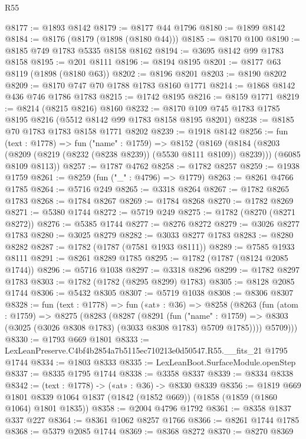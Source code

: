 \begin{lexlean}{R55}
\begin{coremodule}
@8177 := @1893 @8142
@8179 := @8177 @44 @1796
@8180 := @1899 @8142
@8184 := @8176 (@8179 (@1898 (@8180 @44)))
@8185 := @8170 @100
@8190 := @8185 @749 @1783 @5335 @8158 @8162
@8194 := @3695 @8142 @99 @1783 @8158
@8195 := @201 @8111
@8196 := @8194 @8195
@8201 := @8177 @63 @8119 (@1898 (@8180 @63))
@8202 := @8196 @8201
@8203 := @8190 @8202
@8209 := @8170 @747 @70 @1788 @1783 @8160 @1771
@8214 := @1868 @8142 @436 @746 @1786 @1783
@8215 := @1742 @8195
@8216 := @8159 @1771
@8219 := @8214 (@8215 @8216) @8160
@8232 := @8170 @109 @745 @1783 @1785 @8195 @8216 (@5512 @8142 @99 @1783 @8158 @8195 @8201)
@8238 := @8185 @70 @1783 @1783 @8158 @1771 @8202
@8239 := @1918 @8142
@8256 := fun (text : @1778) =>
  fun ("name" : @1759) =>
  @8152
    (@8169
      (@8184 (@8203 (@8209 (@8219 (@8232 (@8238 @8239)) (@5530 @8111 @8109)) @8239)))
      (@6085 @8109 @8113))
@8257 := @1787 @4762
@8258 := @1782 @8257
@8259 := @1938 @1759
@8261 := @8259 (fun ("_" : @4796) => @1779)
@8263 := @8261 @4766 @1785
@8264 := @5716 @249
@8265 := @3318 @8264
@8267 := @1782 @8265 @1783
@8268 := @1784 @8267
@8269 := @1784 @8268
@8270 := @1782 @8269
@8271 := @5380 @1744
@8272 := @5719 @249
@8275 := @1782 (@8270 (@8271 @8272))
@8276 := @5385 @1744
@8277 := @8276 @8272
@8279 := @3026 @8277 @1783
@8280 := @3025 @8279
@8282 := @3033 @8277 @1783
@8283 := @8280 @8282
@8287 := @1782 (@1787 (@7581 @1933 @8111))
@8289 := @7585 @1933 @8111
@8291 := @8261 @8289 @1785
@8295 := @1782 (@1787 (@8124 @2085 @1744))
@8296 := @5716 @1038
@8297 := @3318 @8296
@8299 := @1782 @8297 @1783
@8303 := @1782 (@1782 (@8295 @8299) @1783)
@8305 := @8128 @2085 @1744
@8306 := @5432 @8305
@8307 := @5719 @1038
@8308 := @8306 @8307
@8328 := fun (text : @1778) =>
  fun («at» : @36) =>
  @8258
    (@8263
      (fun (atom : @1759) =>
      @8275
        (@8283
          (@8287
            (@8291
              (fun ("name" : @1759) =>
              @8303 (@3025 (@3026 @8308 @1783) (@3033 @8308 @1783) @5709 @1785))))
          @5709)))
@8330 := @1793 @669 @1801
@8333 := LexLeanPreserve.C4bf4b2854a7b5115ec710213e0d50547.R55.__fits_21 @1795 @1744
@8334 := @1803 @8333
@8335 := LexLeanBoot.SurfaceModule.openStep
@8337 := @8335 @1795 @1744
@8338 := @3358 @8337
@8339 := @8334 @8338
@8342 := (text : @1778) -> («at» : @36) -> @8330 @8339
@8356 := @1819
    @669
    @1801
    @8339
    @1064
    @1837
    (@1842 (@1852 @669))
    (@1858 (@1859 (@1860 @1064) @1801 @1835))
@8358 := @2004 @4796 @1792
@8361 := @8358 @1837 @337 @227
@8364 := @8361 @1062 @8257 @1766
@8366 := @8261 @1744 @1785
@8368 := @5379 @2085 @1744
@8369 := @8368 @8272
@8370 := @8270 @8369

\end{coremodule}
\end{lexlean}
